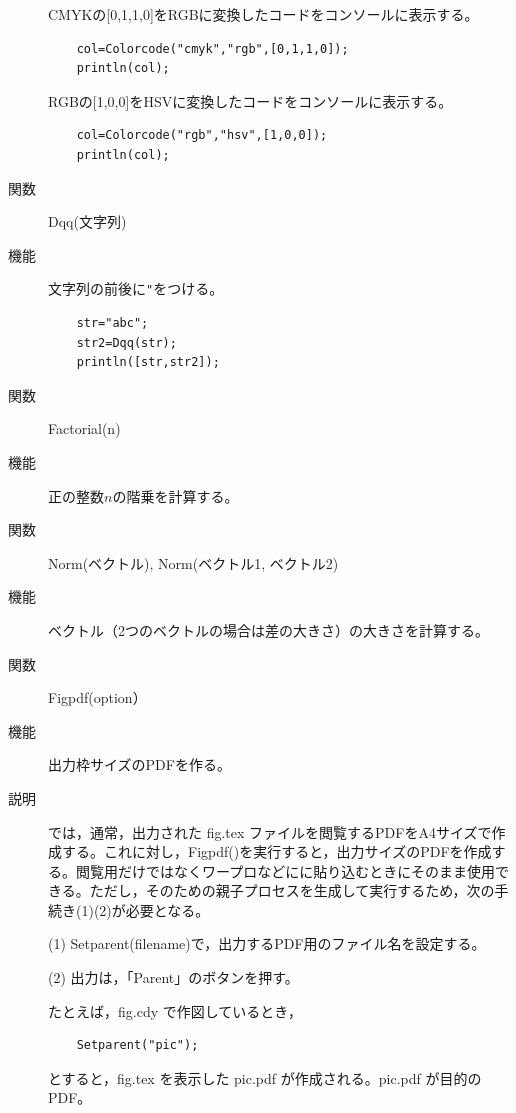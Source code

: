 \documentclass[papersize,a4paper,12pt,uplatex]{jsarticle}
\begin{document}
\begin{description}
CMYKの[0,1,1,0]をRGBに変換したコードをコンソールに表示する。

\begin{verbatim}
    col=Colorcode("cmyk","rgb",[0,1,1,0]);
    println(col); 
\end{verbatim}
    
RGBの[1,0,0]をHSVに変換したコードをコンソールに表示する。

\begin{verbatim}
    col=Colorcode("rgb","hsv",[1,0,0]);
    println(col); 
\end{verbatim}

\vspace{\baselineskip}
\hypertarget{dqq}{}
\item[関数]  Dqq(文字列)
\item[機能]  文字列の前後に\verb|"|をつける。
\begin{verbatim}
    str="abc";
    str2=Dqq(str);
    println([str,str2]); 
\end{verbatim}

\vspace{\baselineskip}
\hypertarget{factorial}{}
\item[関数]  Factorial(n)
\item[機能]  正の整数$n$の階乗を計算する。

\vspace{\baselineskip}
\hypertarget{norm}{}
\item[関数]  Norm(ベクトル), Norm(ベクトル1, ベクトル2)
\item[機能]  ベクトル（2つのベクトルの場合は差の大きさ）の大きさを計算する。

\vspace{\baselineskip}
\hypertarget{figpdf}{}
\item[関数]  Figpdf(option）
\item[機能]  出力枠サイズのPDFを作る。
\item[説明]  \ketcindy では，通常，出力された fig.tex ファイルを閲覧するPDFをA4サイズで作成する。これに対し，Figpdf()を実行すると，出力サイズのPDFを作成する。閲覧用だけではなくワープロなどにに貼り込むときにそのまま使用できる。ただし，そのための親子プロセスを生成して実行するため，次の手続き(1)(2)が必要となる。

\vspace{\baselineskip}
(1) Setparent(filename)で，出力するPDF用のファイル名を設定する。

(2) 出力は，「Parent」のボタンを押す。

\vspace{\baselineskip}
たとえば，fig.cdy で作図しているとき，
\begin{verbatim}
    Setparent("pic");
\end{verbatim}
とすると，fig.tex を表示した pic.pdf が作成される。pic.pdf が目的のPDF。
  

\end{description}
\end{document}
